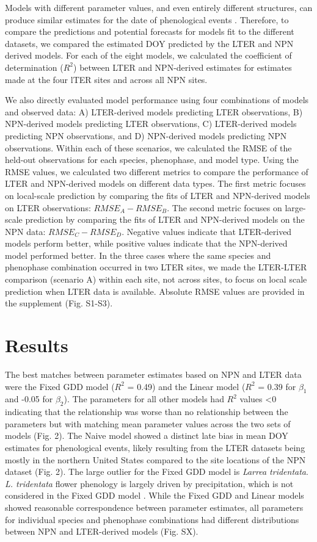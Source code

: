 \documentclass[fleqn,12pt,lineno]{wlpeerj} %
\begin{document}
Models with different parameter values, and even entirely different structures, can produce similar estimates for the date of phenological events \citep{basler2016}. Therefore, to compare the predictions and potential forecasts for models fit to the different datasets, we compared the estimated DOY predicted by the LTER and NPN derived models. For each of the eight models, we calculated the coefficient of determination ($R^2$) between LTER and NPN-derived estimates for estimates made at the four lTER sites and across all NPN sites.  

We also directly evaluated model performance using four combinations of models and observed data: A) LTER-derived models predicting LTER observations, B) NPN-derived models predicting LTER observations, C) LTER-derived models predicting NPN observations, and D) NPN-derived models predicting NPN observations. Within each of these scenarios, we calculated the RMSE of the held-out observations for each species, phenophase, and model type. Using the RMSE values, we calculated two different metrics to compare the performance of LTER and NPN-derived models on different data types. The first metric focuses on local-scale prediction by comparing the fits of LTER and NPN-derived models on LTER observations: $RMSE_{A} - RMSE_{B}$. The second metric focuses on large-scale prediction by comparing the fits of LTER and NPN-derived models on the NPN data: $RMSE_{C} - RMSE_{D}$. Negative values indicate that LTER-derived models perform better, while positive values indicate that the NPN-derived model performed better. In the three cases where the same species and phenophase combination occurred in two LTER sites, we made the LTER-LTER comparison (scenario A) within each site, not across sites, to focus on local scale prediction when LTER data is available. Absolute RMSE values are provided in the supplement (Fig. S1-S3).

\section*{Results}

The best matches between parameter estimates based on NPN and LTER data were the Fixed GDD model ($R^2$ = 0.49) and the Linear model ($R^2$ = 0.39 for $\beta_{1}$ and -0.05 for $\beta_{2}$). The parameters for all other models had $R^2$ values \textless 0 indicating that the relationship was worse than no relationship between the parameters but with matching mean parameter values across the two sets of models (Fig. 2). The Naive model showed a distinct late bias in mean DOY estimates for phenological events, likely resulting from the LTER datasets being mostly in the northern United States compared to the site locations of the NPN dataset (Fig. 2). The large outlier for the Fixed GDD model is \textit{Larrea tridentata}. \textit{L. tridentata} flower phenology is largely driven by precipitation, which is not considered in the Fixed GDD model \citep{beatley1974}. While the Fixed GDD and Linear models showed reasonable correspondence between parameter estimates, all parameters for individual species and phenophase combinations had different distributions between NPN and LTER-derived models (Fig. SX).
\end{document}
